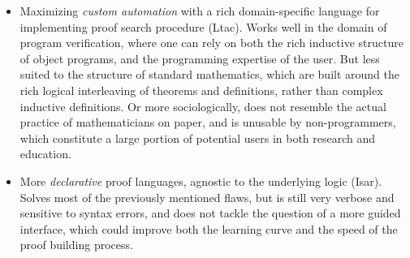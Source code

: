 \begin{itemize}
  \item Maximizing \emph{custom automation} with a rich domain-specific language
  for implementing proof search procedure (Ltac). Works well in the domain of
  program verification, where one can rely on both the rich inductive structure
  of object programs, and the programming expertise of the user. But less suited
  to the structure of standard mathematics, which are built around the rich
  logical interleaving of theorems and definitions, rather than complex
  inductive definitions. Or more sociologically, does not resemble the actual
  practice of mathematicians on paper, and is unusable by non-programmers, which
  constitute a large portion of potential users in both research and education.
  \item More \emph{declarative} proof languages, agnostic to the underlying
  logic (Isar). Solves most of the previously mentioned flaws, but is still very
  verbose and sensitive to syntax errors, and does not tackle the question of a
  more guided interface, which could improve both the learning curve and the
  speed of the proof building process.
\end{itemize}
